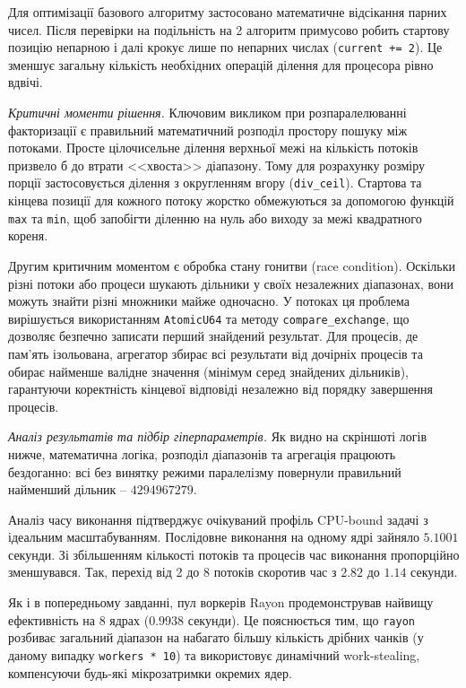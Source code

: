 \documentclass[14pt, a4paper]{extreport}
\begin{document}
	Для оптимізації базового алгоритму застосовано математичне відсікання парних чисел. Після перевірки на подільність на 2 алгоритм примусово робить стартову позицію непарною і далі крокує лише по непарних числах (\texttt{current += 2}). Це зменшує загальну кількість необхідних операцій ділення для процесора рівно вдвічі.
	
	\textit{Критичні моменти рішення.}
	Ключовим викликом при розпаралелюванні факторизації є правильний математичний розподіл простору пошуку між потоками. Просте цілочисельне ділення верхньої межі на кількість потоків призвело б до втрати <<хвоста>> діапазону. Тому для розрахунку розміру порції застосовується ділення з округленням вгору (\texttt{div\_ceil}). Стартова та кінцева позиції для кожного потоку жорстко обмежуються за допомогою функцій \texttt{max} та \texttt{min}, щоб запобігти діленню на нуль або виходу за межі квадратного кореня.
	
	Другим критичним моментом є обробка стану гонитви (race condition). Оскільки різні потоки або процеси шукають дільники у своїх незалежних діапазонах, вони можуть знайти різні множники майже одночасно. У потоках ця проблема вирішується використанням \texttt{AtomicU64} та методу \texttt{compare\_exchange}, що дозволяє безпечно записати перший знайдений результат. Для процесів, де пам'ять ізольована, агрегатор збирає всі результати від дочірніх процесів та обирає найменше валідне значення (мінімум серед знайдених дільників), гарантуючи коректність кінцевої відповіді незалежно від порядку завершення процесів.
	
	\textit{Аналіз результатів та підбір гіперпараметрів.}
	Як видно на скріншоті логів нижче, математична логіка, розподіл діапазонів та агрегація працюють бездоганно: всі без винятку режими паралелізму повернули правильний найменший дільник -- $4294967279$.
	
	
	Аналіз часу виконання підтверджує очікуваний профіль CPU-bound задачі з ідеальним масштабуванням. Послідовне виконання на одному ядрі зайняло $5.1001$ секунди. Зі збільшенням кількості потоків та процесів час виконання пропорційно зменшувався. Так, перехід від 2 до 8 потоків скоротив час з $2.82$ до $1.14$ секунди.
	
	
	Як і в попередньому завданні, пул воркерів Rayon продемонстрував найвищу ефективність на 8 ядрах ($0.9938$ секунди). Це пояснюється тим, що \texttt{rayon} розбиває загальний діапазон на набагато більшу кількість дрібних чанків (у даному випадку \texttt{workers * 10}) та використовує динамічний work-stealing, компенсуючи будь-які мікрозатримки окремих ядер. 
	
\end{document}
